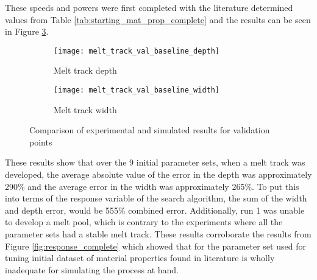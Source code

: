These speeds and powers were first completed with the literature determined values from Table \ref{tab:starting_mat_prop_complete} and the results can be seen in Figure \ref{fig:melt_track_val_baseline}.
\begin{figure}[!htb]\centering
	\begin{subfigure}[c]{0.45\textwidth}\centering
	\texttt{[image: melt\_track\_val\_baseline\_depth]}
	\caption{Melt track depth}
	\label{fig:melt_track_val_baseline_depth}
	\end{subfigure}\hfill{}
		\begin{subfigure}[c]{0.45\textwidth}\centering
		\texttt{[image: melt\_track\_val\_baseline\_width]}
		\caption{Melt track width}
		\label{fig:melt_track_val_baseline_width}
		\end{subfigure}
	\caption{Comparison of experimental and simulated results for validation points}
	\label{fig:melt_track_val_baseline}
\end{figure}
These results show that over the 9 initial parameter sets, when a melt track was developed, the average absolute value of the error in the depth was approximately 290\% and the average error in the width was approximately 265\%.  To put this into terms of the response variable of the search algorithm, the sum of the width and depth error, would be 555\% combined error.
Additionally, run 1 was unable to develop a melt pool, which is contrary to the experiments where all the parameter sets had a stable melt track.  These results corroborate the results from Figure \ref{fig:response_complete} which showed that for the parameter set used for tuning initial dataset of material properties found in literature is wholly inadequate for simulating the process at hand. 


